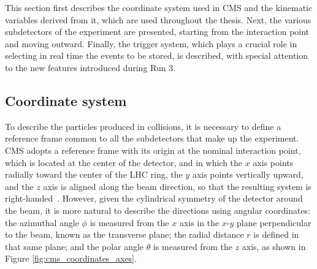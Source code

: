 This section first describes the coordinate system used in CMS and the kinematic variables derived from it, which are used throughout the thesis. Next, the various subdetectors of the experiment are presented, starting from the interaction point and moving outward. Finally, the trigger system, which plays a crucial role in selecting in real time the events to be stored, is described, with special attention to the new features introduced during Run 3.


\subsection{Coordinate system}
\label{subsec:CMS_coordinates}
%
To describe the particles produced in collisions, it is necessary to define a reference frame common to all the subdetectors that make up the experiment. CMS adopts a reference frame with its origin at the nominal interaction point, which is located at the center of the detector, and in which the $x$ axis points radially toward the center of the LHC ring, the $y$ axis points vertically upward, and the $z$ axis is aligned along the beam direction, so that the resulting system is right-handed~\cite{CMS:2008xjf}. However, given the cylindrical symmetry of the detector around the beam, it is more natural to describe the directions using angular coordinates: the azimuthal angle $\phi$ is measured from the $x$ axis in the $x$-$y$ plane perpendicular to the beam, known as the transverse plane; the radial distance $r$ is defined in that same plane; and the polar angle $\theta$ is measured from the $z$ axis, as shown in Figure \ref{fig:cms_coordinates_axes}.


